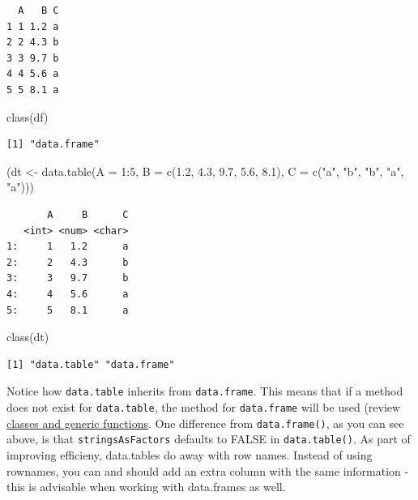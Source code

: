 \documentclass[
]{book}
\newenvironment{Shaded}{\begin{snugshade}}{\end{snugshade}}
\newcommand{\AttributeTok}[1]{\textcolor[rgb]{0.77,0.63,0.00}{#1}}
\newcommand{\DecValTok}[1]{\textcolor[rgb]{0.00,0.00,0.81}{#1}}
\newcommand{\FloatTok}[1]{\textcolor[rgb]{0.00,0.00,0.81}{#1}}
\newcommand{\FunctionTok}[1]{\textcolor[rgb]{0.00,0.00,0.00}{#1}}
\newcommand{\NormalTok}[1]{#1}
\newcommand{\OtherTok}[1]{\textcolor[rgb]{0.56,0.35,0.01}{#1}}
\newcommand{\SpecialCharTok}[1]{\textcolor[rgb]{0.00,0.00,0.00}{#1}}
\newcommand{\StringTok}[1]{\textcolor[rgb]{0.31,0.60,0.02}{#1}}
\begin{document}
\begin{verbatim}
  A   B C
1 1 1.2 a
2 2 4.3 b
3 3 9.7 b
4 4 5.6 a
5 5 8.1 a
\end{verbatim}

\begin{Shaded}
\begin{Highlighting}[]
\FunctionTok{class}\NormalTok{(df)}
\end{Highlighting}
\end{Shaded}

\begin{verbatim}
[1] "data.frame"
\end{verbatim}

\begin{Shaded}
\begin{Highlighting}[]
\NormalTok{(dt }\OtherTok{\textless{}{-}} \FunctionTok{data.table}\NormalTok{(}\AttributeTok{A =} \DecValTok{1}\SpecialCharTok{:}\DecValTok{5}\NormalTok{,}
                  \AttributeTok{B =} \FunctionTok{c}\NormalTok{(}\FloatTok{1.2}\NormalTok{, }\FloatTok{4.3}\NormalTok{, }\FloatTok{9.7}\NormalTok{, }\FloatTok{5.6}\NormalTok{, }\FloatTok{8.1}\NormalTok{),}
                  \AttributeTok{C =} \FunctionTok{c}\NormalTok{(}\StringTok{"a"}\NormalTok{, }\StringTok{"b"}\NormalTok{, }\StringTok{"b"}\NormalTok{, }\StringTok{"a"}\NormalTok{, }\StringTok{"a"}\NormalTok{)))}
\end{Highlighting}
\end{Shaded}

\begin{verbatim}
       A     B      C
   <int> <num> <char>
1:     1   1.2      a
2:     2   4.3      b
3:     3   9.7      b
4:     4   5.6      a
5:     5   8.1      a
\end{verbatim}

\begin{Shaded}
\begin{Highlighting}[]
\FunctionTok{class}\NormalTok{(dt)}
\end{Highlighting}
\end{Shaded}

\begin{verbatim}
[1] "data.table" "data.frame"
\end{verbatim}

Notice how \texttt{data.table} inherits from \texttt{data.frame}. This means that if a method does not exist for \texttt{data.table}, the method for \texttt{data.frame} will be used (review \protect\hyperlink{classes}{classes and generic functions}.
One difference from \texttt{data.frame()}, as you can see above, is that \texttt{stringsAsFactors} defaults to FALSE in \texttt{data.table()}. As part of improving efficieny, data.tables do away with row names. Instead of using rownames, you can and should add an extra column with the same information - this is advisable when working with data.frames as well.
\end{document}
